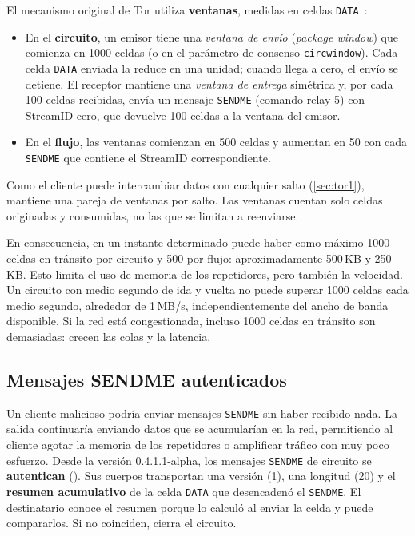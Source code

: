 El mecanismo original de Tor utiliza \textbf{ventanas}, medidas en celdas \texttt{DATA}~:
\begin{itemize}
  \item En el \textbf{circuito}, un emisor tiene una \emph{ventana de envío} (\emph{package window}) que comienza en 1000 celdas (o en el parámetro de consenso \texttt{circwindow}). Cada celda \texttt{DATA} enviada la reduce en una unidad; cuando llega a cero, el envío se detiene. El receptor mantiene una \emph{ventana de entrega} simétrica y, por cada 100 celdas recibidas, envía un mensaje \texttt{SENDME} (comando relay 5) con StreamID cero, que devuelve 100 celdas a la ventana del emisor.
  \item En el \textbf{flujo}, las ventanas comienzan en 500 celdas y aumentan en 50 con cada \texttt{SENDME} que contiene el StreamID correspondiente.
\end{itemize}

Como el cliente puede intercambiar datos con cualquier salto (\cref{sec:tor1}), mantiene una pareja de ventanas por salto. Las ventanas cuentan solo celdas originadas y consumidas, no las que se limitan a reenviarse.

En consecuencia, en un instante determinado puede haber como máximo 1000 celdas en tránsito por circuito y 500 por flujo: aproximadamente 500\,KB y 250\,KB. Esto limita el uso de memoria de los repetidores, pero también la velocidad. Un circuito con medio segundo de ida y vuelta no puede superar 1000 celdas cada medio segundo, alrededor de 1\,MB/s, independientemente del ancho de banda disponible. Si la red está congestionada, incluso 1000 celdas en tránsito son demasiadas: crecen las colas y la latencia.

\subsection{Mensajes SENDME autenticados}

Un cliente malicioso podría enviar mensajes \texttt{SENDME} sin haber recibido nada. La salida continuaría enviando datos que se acumularían en la red, permitiendo al cliente agotar la memoria de los repetidores o amplificar tráfico con muy poco esfuerzo. Desde la versión 0.4.1.1-alpha, los mensajes \texttt{SENDME} de circuito se \textbf{autentican} (). Sus cuerpos transportan una versión (1), una longitud (20) y el \textbf{resumen acumulativo} de la celda \texttt{DATA} que desencadenó el \texttt{SENDME}. El destinatario conoce el resumen porque lo calculó al enviar la celda y puede compararlos. Si no coinciden, cierra el circuito.

